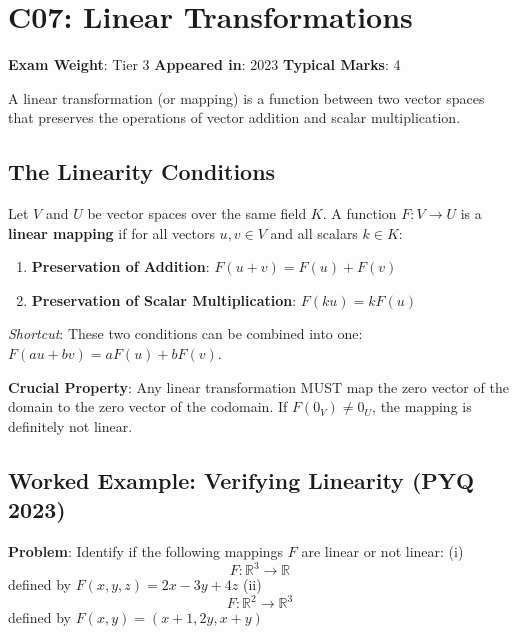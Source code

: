 \documentclass[
]{article}
\providecommand{\tightlist}{%
  \setlength{\itemsep}{0pt}\setlength{\parskip}{0pt}}
\renewenvironment{quote}
  {\begin{tcolorbox}[
     colback=calloutbg,
     colframe=calloutframe,
     colupper=callouttext,
     arc=3pt,
     boxrule=0.5pt,
     leftrule=0.5pt,
     borderline west={3pt}{0pt}{calloutaccent},
     left=8pt,
     right=8pt,
     top=6pt,
     bottom=6pt
   ]}
  {\end{tcolorbox}}
\begin{document}
\section{C07: Linear Transformations}\label{c07-linear-transformations}

\begin{quote}
\textbf{Exam Weight}: Tier 3 \textbar{} \textbf{Appeared in}: 2023
\textbar{} \textbf{Typical Marks}: 4
\end{quote}

A linear transformation (or mapping) is a function between two vector
spaces that preserves the operations of vector addition and scalar
multiplication.

\subsection{The Linearity Conditions}\label{the-linearity-conditions}

Let \(V\) and \(U\) be vector spaces over the same field \(K\). A
function \(F: V \to U\) is a \textbf{linear mapping} if for all vectors
\(u, v \in V\) and all scalars \(k \in K\):

\begin{enumerate}
\def\labelenumi{\arabic{enumi}.}
\tightlist
\item
  \textbf{Preservation of Addition}: \(F(u + v) = F(u) + F(v)\)
\item
  \textbf{Preservation of Scalar Multiplication}: \(F(ku) = kF(u)\)
\end{enumerate}

\emph{Shortcut}: These two conditions can be combined into one:
\(F(au + bv) = aF(u) + bF(v)\).

\textbf{Crucial Property}: Any linear transformation MUST map the zero
vector of the domain to the zero vector of the codomain. If
\(F(0_V) \neq 0_U\), the mapping is definitely not linear.

\subsection{Worked Example: Verifying Linearity (PYQ
2023)}\label{worked-example-verifying-linearity-pyq-2023}

\textbf{Problem}: Identify if the following mappings \(F\) are linear or
not linear: (i)
\[
F : \mathbb{R}^3 \to \mathbb{R}
\]
defined by \(F(x, y, z) = 2x - 3y + 4z\) (ii)
\[
F : \mathbb{R}^2 \to \mathbb{R}^3
\]
defined by \(F(x, y) = (x+1, 2y, x+y)\)
\end{document}
